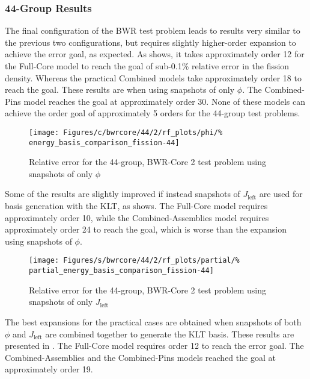 \subsubsection{44-Group Results}

The final configuration of the BWR test problem leads to results very similar to 
the previous two configurations, but requires slightly higher-order expansion to achieve the 
error goal, as expected.  As  shows, it takes 
approximately order 12 for the Full-Core model to reach the goal of sub-0.1\% 
relative error in the fission density.  Whereas the practical Combined models 
take approximately order 18 to reach the goal.  These results are when using 
snapshots of only $\phi$.  The Combined-Pins model reaches the goal at 
approximately order 30.  None of these models can achieve the order goal of 
approximately 5 orders for the 44-group test problems.

\begin{figure*}[tb]
    \centering
    \texttt{[image: Figures/c/bwrcore/44/2/rf\_plots/phi/\%
        energy\_basis\_comparison\_fission-44]}
    \caption{Relative error for the 44-group, BWR-Core 2 test problem using 
        snapshots of only $\phi$}
    \label{fig:BWR2_phi}
\end{figure*}

Some of the results are slightly improved if instead snapshots of 
$J_{\text{left}}$ are used for basis generation with the KLT, as  shows.  The 
Full-Core model requires approximately order 10, 
while the Combined-Assemblies model requires approximately order 24 to reach 
the goal, which is worse than the expansion using snapshots of $\phi$.

\begin{figure*}[tb]
    \centering
    \texttt{[image: Figures/s/bwrcore/44/2/rf\_plots/partial/\%
        partial\_energy\_basis\_comparison\_fission-44]}
    \caption{Relative error for the 44-group, BWR-Core 2 test problem using 
        snapshots of only $J_{\text{left}}$}
    \label{fig:BWR2_partial}
\end{figure*}

The best expansions for the practical cases are obtained when snapshots of both 
$\phi$ and $J_{\text{left}}$ are combined together to generate 
the KLT basis.  These results are presented in .  
The Full-Core model requires order 12 to reach the error goal.  The 
Combined-Assemblies and the Combined-Pins models reached the goal at 
approximately order 
19.  

